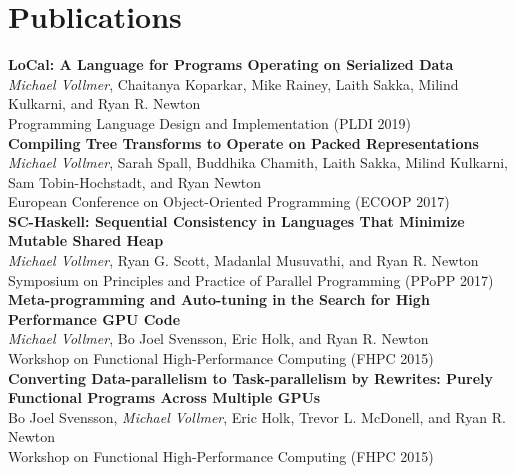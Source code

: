 \documentclass[showabstract,showacknowledgments,showpreface,showdedication,school]{iuphd}
\theoremstyle{nonumberplain}
\begin{document}
\section*{Publications}
{\bf LoCal: A Language for Programs Operating on Serialized Data} \\
\emph{Michael Vollmer}, Chaitanya Koparkar, Mike Rainey, Laith Sakka, Milind Kulkarni, and Ryan R. Newton \\
Programming Language Design and Implementation (PLDI 2019) \\
 {\bf Compiling Tree Transforms to Operate on Packed Representations}\\
\emph{Michael Vollmer}, Sarah Spall, Buddhika Chamith, Laith Sakka, Milind Kulkarni, Sam Tobin-Hochstadt, and Ryan Newton \\
European Conference on Object-Oriented Programming (ECOOP 2017) \\
{\bf SC-Haskell: Sequential Consistency in Languages That Minimize Mutable Shared Heap}  \\
\emph{Michael Vollmer}, Ryan G. Scott, Madanlal Musuvathi, and Ryan R. Newton \\
Symposium on Principles and Practice of Parallel Programming (PPoPP 2017) \\
{\bf Meta-programming and Auto-tuning in the Search for High Performance GPU Code}  \\
\emph{Michael Vollmer}, Bo Joel Svensson, Eric Holk, and Ryan R. Newton \\
Workshop on Functional High-Performance Computing (FHPC 2015) \\
{\bf Converting Data-parallelism to Task-parallelism by Rewrites: Purely Functional Programs Across Multiple GPUs} \\
Bo Joel Svensson, \emph{Michael Vollmer}, Eric Holk, Trevor L. McDonell, and Ryan R. Newton \\
Workshop on Functional High-Performance Computing (FHPC 2015) \\

\thispagestyle{empty}
\end{document}
